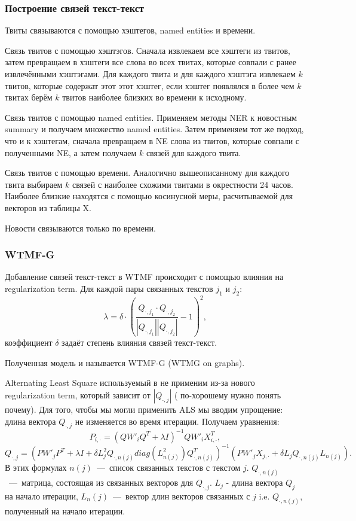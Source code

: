         \subsubsection{Построение связей текст-текст}
            Твиты связываются с помощью хэштегов, named entities и времени.

            Связь твитов с помощью хэштэгов. Сначала извлекаем все хэштеги из твитов, затем превращаем в хэштеги все слова во всех твитах, которые совпали с ранее извлечёнными хэштэгами. Для каждого твита и для каждого хэштэга извлекаем $k$ твитов, которые содержат этот этот хэштег, если хэштег появлялся в более чем $k$ твитах берём $k$ твитов наиболее близких во времени к исходному.

            Связь твитов с помощью named entities. Применяем методы NER к новостным summary и получаем множество named entities. Затем применяем тот же подход, что и к хэштегам, сначала превращаем в NE слова из твитов, которые совпали с полученными NE, а затем получаем $k$ связей для каждого твита.

            Связь твитов с помощью времени. Аналогично вышеописанному для каждого твита выбираем $k$ связей с наиболее схожими твитами в окрестности 24 часов. Наиболее близкие находятся с помощью косинусной меры, расчитываемой для векторов из таблицы X.

            Новости связываются только по времени.
        \subsubsection{WTMF-G}
            Добавление связей текст-текст в WTMF происходит с помощью влияния на regularization term. Для каждой пары связанных текстов $j_1$ и $j_2$:
            $$\lambda = \delta \cdot (\dfrac{Q_{\cdot,j_1}\cdot Q_{\cdot,j_2}}{|Q_{\cdot,j_1}|| Q_{\cdot,j_2}|}-1)^2,$$
            коэффициент $\delta$ задаёт степень влияния связей текст-текст.

            Полученная модель и называется WTMF-G (WTMG on graphs).

            Alternating Least Square используемый в \cite{steck_recommender} не применим из-за нового regularization term, который зависит от $|Q_{\cdot,j}|$ ({\color{red} по-хорошему нужно понять почему}). Для того, чтобы мы могли применить ALS мы вводим упрощение: длина вектора $Q_{\cdot,j}$ не изменяется во время итерации. Получаем уравнения:
            $$P_{i, \cdot} = (Q W'_i Q^T + \lambda I)^{-1} Q W'_i X_{i,\cdot}^T,$$
            $$Q_{\cdot, j} = (P W'_j P^T + \lambda I + \delta  L_j^2 Q_{\cdot,n(j)} diag(L^2_{n(j)})Q_{\cdot,n(j)}^T)^{-1}   (P W'_j X_{j,\cdot} + \delta  L_j Q_{\cdot,n(j)} L_{n(j)}).$$
            В этих формулах $n(j)$~---~список связанных текстов с текстом $j$. $Q_{\cdot,n(j)}$~---~матрица, состоящая из связанных векторов для $Q_{\cdot, j}$. $L_j$ - длина вектора $Q_j$ на начало итерации, $L_n(j)$~---~вектор длин векторов связанных с $j$ i.e. $Q_{\cdot,n(j)}$, полученный на начало итерации.